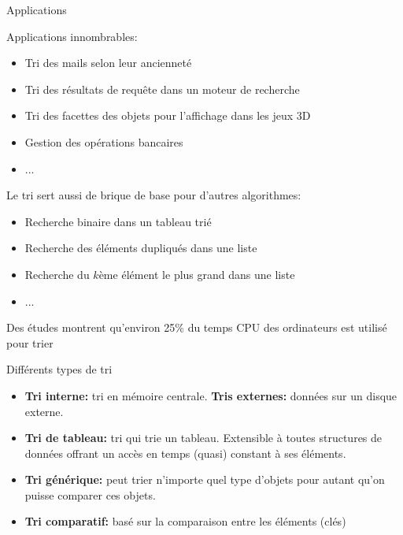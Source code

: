 \begin{frame}{Applications}

Applications innombrables:
\begin{itemize}
\item Tri des mails selon leur ancienneté
\item Tri des résultats de requête dans un moteur de recherche
\item Tri des facettes des objets pour l'affichage dans les jeux 3D
\item Gestion des opérations bancaires
\item ...
\end{itemize}

\bigskip

Le tri sert aussi de brique de base pour d'autres algorithmes:
\begin{itemize}
\item Recherche binaire dans un tableau trié
\item Recherche des éléments dupliqués dans une liste
\item Recherche du $k$ème élément le plus grand dans une liste
\item ...
\end{itemize}

\bigskip

Des études montrent qu'environ 25\% du temps CPU des ordinateurs est utilisé pour trier
\end{frame}

\begin{frame}{Différents types de tri}

\begin{itemize}
\item {\bf Tri interne:} tri en mémoire centrale. {\bf Tris externes:} données sur un disque externe.
\item {\bf Tri de tableau:} tri qui trie un tableau. Extensible à toutes structures de données offrant un accès en temps (quasi) constant à ses éléments.
\item {\bf Tri générique:} peut trier n'importe quel type d'objets pour autant qu'on puisse comparer ces objets.
\item {\bf Tri comparatif:} basé sur la comparaison entre les éléments (clés)

\end{itemize}

\end{frame}

